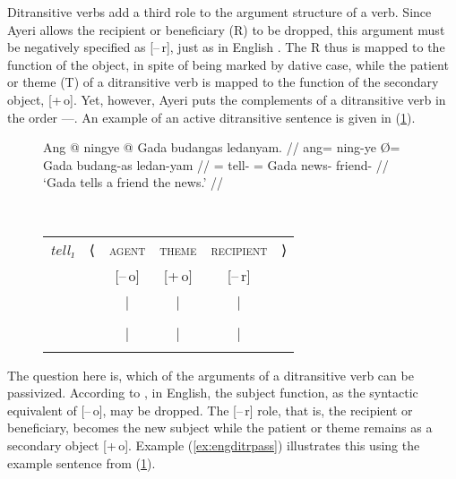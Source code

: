 Ditransitive verbs add a third role to the argument structure of a verb. Since
Ayeri allows the recipient or beneficiary (R) to be dropped, this argument must
be negatively specified as [–\,r], just as in English \citep[338]{bresnan2016}.
The R thus is mapped to the function of the object, in spite of being marked by
dative case, while the patient or theme (T) of a ditransitive verb is mapped to
the function of the secondary object, [+\,o]. Yet, however, Ayeri puts the
complements of a ditransitive verb in the order \SObj{}---\Obj{}. An example of
an active ditransitive sentence is given in (\ref{ex:ditrorder}).

\begin{figure}
\ex\label{ex:ditrorder}
\begin{minipage}[t]{.4\remaining}
\begingl
	\gla Ang @ ningye {} @ Gada budangas ledanyam. //
	\glb ang= ning-ye Ø= Gada budang-as ledan-yam //
	\glc \AgtT{}= tell-\TsgF{} \Top{}= Gada news-\Parg{} friend-\Dat{} //
	\glft `Gada tells a friend the news.' //
\endgl
\end{minipage}
~
\begin{tabular}[t]{>{\itshape}l l c c c r}
tell₁
	& ⟨
	& \textsc{agent}
	& \textsc{theme}
	& \textsc{recipient}
	& ⟩
	\\
%
	& %
	& [–\,o]
	& [+\,o]
	& [–\,r]
	& %
	\\

%
	& %
	& |
	& |
	& |
	& %
	\\

%
	& %
	& \Subj*
	& \SObj
	& \Obj
	& %
	\\

%
	& %
	& |
	& |
	& |
	& %
	\\

%
	& %
	& \fw{Gada}
	& \fw{news}
	& \fw{friend}
	& %
	\\
\end{tabular}
\xe
\end{figure}

The question here is, which of the arguments of a ditransitive verb can be
passivized. According to \citet{bresnan2016}, in English, the subject function,
as the syntactic equivalent of [–\,o], may be dropped. The [–\,r] role, that
is, the recipient or beneficiary, becomes the new subject while the patient or
theme remains as a secondary object [+\,o]. Example (\ref{ex:engditrpass})
illustrates this using the example sentence from (\ref{ex:ditrorder}).

